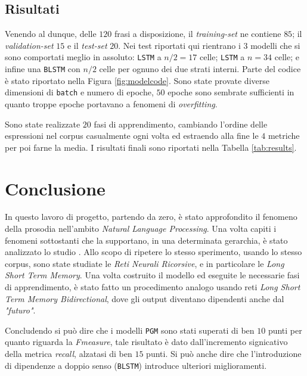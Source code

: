 \documentclass[twoside,twocolumn,10pt]{extarticle}
\theoremstyle{definition}
\begin{document}
	\subsection{Risultati}
		Venendo al dunque, delle $120$ frasi a disposizione, il \textit{training-set} ne contiene $85$; il \textit{validation-set} $15$ e il \textit{test-set} $20$. Nei test riportati qui rientrano i $3$ modelli che si sono comportati meglio in assoluto: \texttt{LSTM} a $n/2 = 17$ celle; \texttt{LSTM} a $n = 34$ celle; e infine una \texttt{BLSTM} con $n/2$ celle per ognuno dei due strati interni. Parte del codice è stato riportato nella Figura \ref{fig:modelcode}. Sono state provate diverse dimensioni di \texttt{batch} e numero di epoche, $50$ epoche sono sembrate sufficienti in quanto troppe epoche portavano a fenomeni di \textit{overfitting}.
		
		Sono state realizzate $20$ fasi di apprendimento, cambiando l'ordine delle espressioni nel corpus casualmente ogni volta ed estraendo alla fine le $4$ metriche per poi farne la media. I risultati finali sono riportati nella Tabella \ref{tab:results}.
	
\section{Conclusione}
	In questo lavoro di progetto, partendo da zero, è stato approfondito il fenomeno della prosodia nell'ambito \textit{Natural Language Processing}. Una volta capiti i fenomeni sottostanti che la supportano, in una determinata gerarchia, è stato analizzato lo studio \cite{bib:prominence-detection-italian}. Allo scopo di ripetere lo stesso sperimento, usando lo stesso corpus, sono state studiate le \textit{Reti Neurali Ricorsive}, e in particolare le \textit{Long Short Term Memory}. Una volta costruito il modello ed eseguite le necessarie fasi di apprendimento, è stato fatto un procedimento analogo usando reti \textit{Long Short Term Memory Bidirectional}, dove gli output diventano dipendenti anche dal \textit{"futuro"}.
	
	Concludendo si può dire che i modelli \texttt{PGM} sono stati superati di ben $10$ punti per quanto riguarda la \textit{Fmeasure}, tale risultato è dato dall'incremento signicativo della metrica \textit{recall}, alzatasi di ben $15$ punti. Si può anche dire che l'introduzione di dipendenze a doppio senso (\texttt{BLSTM}) introduce ulteriori miglioramenti.
		
\end{document}
